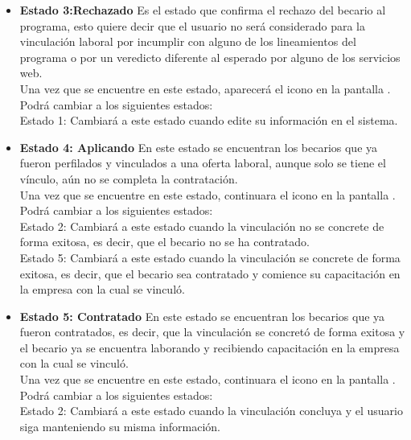 \begin{itemize}
        \item \textbf{Estado 3:Rechazado}
         Es el estado que confirma el rechazo del becario al programa, esto quiere decir que el usuario no será considerado para la vinculación laboral por incumplir con alguno de los lineamientos del programa o por un veredicto diferente al esperado por alguno de los servicios web.\\
        Una vez que se encuentre en este estado, aparecerá el icono \faTimesCircle en la pantalla .\\
        Podrá cambiar a los siguientes estados:\\
        Estado 1: Cambiará a este estado cuando edite su información en el sistema.
        
        \item \textbf{Estado 4: Aplicando} 
        En este estado se encuentran los becarios que ya fueron perfilados y vinculados a una oferta laboral, aunque solo se tiene el vínculo, aún no se completa la contratación.
        \\
       Una vez que se encuentre en este estado, continuara el icono \faCheckCircle en la pantalla .\\
        Podrá cambiar a los siguientes estados:\\
        Estado 2: Cambiará a este estado cuando la vinculación no se concrete de forma exitosa, es decir, que el becario no se ha contratado.\\
         Estado 5: Cambiará a este estado cuando la vinculación se concrete de forma exitosa, es decir, que el becario sea contratado y comience su capacitación en la empresa con la cual se vinculó. 
         
         \item \textbf{Estado 5: Contratado} 
        En este estado se encuentran los becarios que ya fueron contratados, es decir, que la vinculación se concretó de forma exitosa y el becario ya se encuentra laborando y recibiendo capacitación en la empresa con la cual se vinculó.
        \\
       Una vez que se encuentre en este estado, continuara el icono \faCheckCircle en la pantalla .\\
        Podrá cambiar a los siguientes estados:\\
        Estado 2: Cambiará a este estado cuando la vinculación concluya y el usuario siga manteniendo su misma información.\\
         
         
    \end{itemize} 
	
